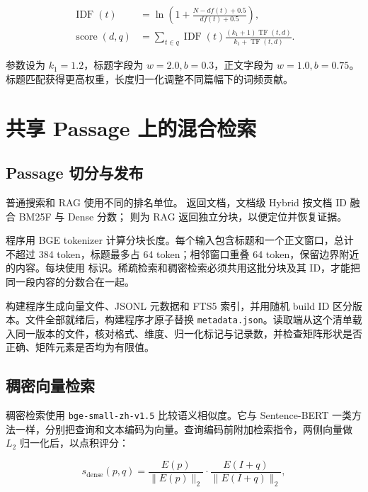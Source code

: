 \documentclass[UTF8,zihao=-4,fontset=fandol]{ctexart}
\newcommand{\code}[1]{\texttt{#1}}
\begin{document}
\begin{align}
\operatorname{IDF}(t)&=\ln\left(1+\frac{N-df(t)+0.5}{df(t)+0.5}\right),\\
\operatorname{score}(d,q)&=\sum_{t\in q}\operatorname{IDF}(t)
\frac{(k_1+1)\operatorname{TF}(t,d)}{k_1+\operatorname{TF}(t,d)}.
\label{eq:bm25f-score}
\end{align}

参数设为 $k_1=1.2$，标题字段为 $w=2.0,b=0.3$，正文字段为 $w=1.0,b=0.75$。标题匹配获得更高权重，长度归一化调整不同篇幅下的词频贡献。

\section{共享 Passage 上的混合检索}

\subsection{Passage 切分与发布}

普通搜索和 RAG 使用不同的排名单位。 返回文档，文档级 Hybrid 按文档 ID 融合 BM25F 与 Dense 分数； 则为 RAG 返回独立分块，以便定位并恢复证据。

程序用 BGE tokenizer 计算分块长度。每个输入包含标题和一个正文窗口，总计不超过 384 token，标题最多占 64 token；相邻窗口重叠 64 token，保留边界附近的内容。每块使用  标识。稀疏检索和稠密检索必须共用这批分块及其 ID，才能把同一段内容的分数合在一起。

构建程序生成向量文件、JSONL 元数据和 FTS5 索引，并用随机 build ID 区分版本。文件全部就绪后，构建程序才原子替换 \code{metadata.json}。读取端从这个清单载入同一版本的文件，核对格式、维度、归一化标记与记录数，并检查矩阵形状是否正确、矩阵元素是否均为有限值。

\subsection{稠密向量检索}

稠密检索使用 \code{bge-small-zh-v1.5}\cite{xiao2023cpack} 比较语义相似度。它与 Sentence-BERT 一类方法一样，分别把查询和文本编码为向量\cite{reimers2019sbert}。查询编码前附加检索指令，两侧向量做 $L_2$ 归一化后，以点积评分：

\begin{equation}
s_{\mathrm{dense}}(p,q)=
\frac{E(p)}{\lVert E(p)\rVert_2}\cdot
\frac{E(I+q)}{\lVert E(I+q)\rVert_2},
\label{eq:dense-score}
\end{equation}
\end{document}

